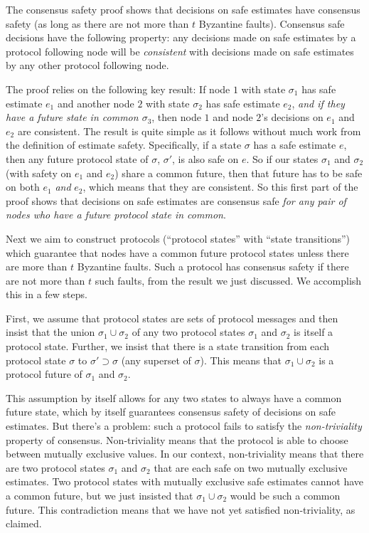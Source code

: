 \documentclass{article}
\theoremstyle{definition}
\begin{document}
The consensus safety proof shows that decisions on safe estimates have consensus safety (as long as there are not more than $t$ Byzantine faults). Consensus safe decisions have the following property: any decisions made on safe estimates by a protocol following node will be \emph{consistent} with decisions made on safe estimates by any other protocol following node.

The proof relies on the following key result: If node $1$ with state $\sigma_1$ has safe estimate $e_1$ and another node $2$ with state $\sigma_2$ has safe estimate $e_2$, \emph{and if they have a future state in common $\sigma_3$}, then node $1$ and node $2$'s decisions on $e_1$ and $e_2$ are consistent. The result is quite simple as it follows without much work from the definition of estimate safety. Specifically, if a state $\sigma$ has a safe estimate $e$, then any future protocol state of $\sigma$, $\sigma'$, is also safe on $e$. So if our states $\sigma_1$ and $\sigma_2$ (with safety on $e_1$ and $e_2$) share a common future, then that future has to be safe on both $e_1$ \emph{and} $e_2$, which means that they are consistent. So this first part of the proof shows that decisions on safe estimates are consensus safe \emph{for any pair of nodes who have a future protocol state in common}.

Next we aim to construct protocols (``protocol states'' with ``state transitions'') which guarantee that nodes have a common future protocol states unless there are more than $t$ Byzantine faults. Such a protocol has consensus safety if there are not more than $t$ such faults, from the result we just discussed. We accomplish this in a few steps.

First, we assume that protocol states are sets of protocol messages and then insist that the union $\sigma_1 \cup \sigma_2$ of any two protocol states $\sigma_1$ and $\sigma_2$ is itself a protocol state. Further, we insist that there is a state transition from each protocol state $\sigma$ to $\sigma' \supset \sigma$ (any superset of $\sigma$). This means that $\sigma_1 \cup \sigma_2$ is a protocol future of $\sigma_1$ and $\sigma_2$.

This assumption by itself allows for any two states to always have a common future state, which by itself guarantees consensus safety of decisions on safe estimates. But there's a problem: such a protocol fails to satisfy the \emph{non-triviality} property of consensus. Non-triviality means that the protocol is able to choose between mutually exclusive values. In our context, non-triviality means that there are two protocol states $\sigma_1$ and $\sigma_2$ that are each safe on two mutually exclusive estimates. Two protocol states with mutually exclusive safe estimates cannot have a common future, but we just insisted that $\sigma_1 \cup \sigma_2$ would be such a common future. This contradiction means that we have not yet satisfied non-triviality, as claimed.
\end{document}
